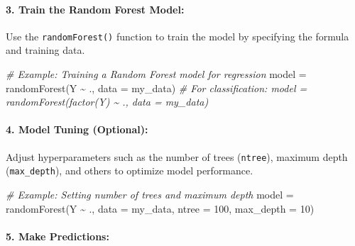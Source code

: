 \documentclass[
]{article}
\newenvironment{Shaded}{}{}
\newcommand{\AttributeTok}[1]{\textcolor[rgb]{0.49,0.56,0.16}{#1}}
\newcommand{\CommentTok}[1]{\textcolor[rgb]{0.38,0.63,0.69}{\textit{#1}}}
\newcommand{\DecValTok}[1]{\textcolor[rgb]{0.25,0.63,0.44}{#1}}
\newcommand{\FunctionTok}[1]{\textcolor[rgb]{0.02,0.16,0.49}{#1}}
\newcommand{\NormalTok}[1]{#1}
\newcommand{\OtherTok}[1]{\textcolor[rgb]{0.00,0.44,0.13}{#1}}
\newcommand{\SpecialCharTok}[1]{\textcolor[rgb]{0.25,0.44,0.63}{#1}}
\begin{document}
\hypertarget{3-train-the-random-forest-model}{%
\paragraph{\texorpdfstring{3. \textbf{Train the Random Forest
Model:}}{3. Train the Random Forest Model:}}\label{3-train-the-random-forest-model}}

Use the \texttt{randomForest()} function to train the model by
specifying the formula and training data.

\begin{Shaded}
\begin{Highlighting}[]
\CommentTok{\# Example: Training a Random Forest model for regression}
\NormalTok{model }\OtherTok{=} \FunctionTok{randomForest}\NormalTok{(Y }\SpecialCharTok{\textasciitilde{}}\NormalTok{ ., }\AttributeTok{data =}\NormalTok{ my\_data)}
\CommentTok{\# For classification: model = randomForest(factor(Y) \textasciitilde{} ., data = my\_data)}
\end{Highlighting}
\end{Shaded}

\hypertarget{4-model-tuning-optional}{%
\paragraph{\texorpdfstring{4. \textbf{Model Tuning
(Optional):}}{4. Model Tuning (Optional):}}\label{4-model-tuning-optional}}

Adjust hyperparameters such as the number of trees (\texttt{ntree}),
maximum depth (\texttt{max\_depth}), and others to optimize model
performance.

\begin{Shaded}
\begin{Highlighting}[]
\CommentTok{\# Example: Setting number of trees and maximum depth}
\NormalTok{model }\OtherTok{=} \FunctionTok{randomForest}\NormalTok{(Y }\SpecialCharTok{\textasciitilde{}}\NormalTok{ ., }\AttributeTok{data =}\NormalTok{ my\_data, }\AttributeTok{ntree =} \DecValTok{100}\NormalTok{, }\AttributeTok{max\_depth =} \DecValTok{10}\NormalTok{)}
\end{Highlighting}
\end{Shaded}

\hypertarget{5-make-predictions}{%
\paragraph{\texorpdfstring{5. \textbf{Make
Predictions:}}{5. Make Predictions:}}\label{5-make-predictions}}
\end{document}
